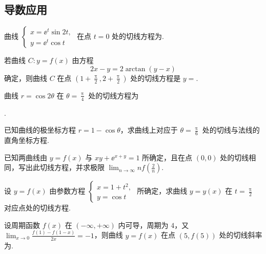 \subsection{导数应用}

	\begin{ti}
		曲线 $\begin{cases}
			x = \ee^{t} \sin 2t,\\
			y = \ee^{t} \cos t
		\end{cases}$ 在点 $t = 0$ 处的切线方程为\htwo.
	\end{ti}

	\begin{ti}
		若曲线 $C: y = f(x)$ 由方程
		\[
			2x - y = 2\arctan(y - x)
		\]
		确定，则曲线 $C$ 在点 $\left( 1 + \frac{\uppi}{2}, 2 + \frac{\uppi}{2} \right)$ 处的切线方程是 $y = $\htwo.
	\end{ti}

	\begin{ti}
		曲线 $r = \cos 2 \theta$ 在 $\theta = \frac{\uppi}{4}$ 处的切线方程为\htwo
		
		\noindent\htwo.
	\end{ti}

	\begin{ti}
		已知曲线的极坐标方程 $r = 1 - \cos \theta$，求曲线上对应于 $\theta = \frac{\uppi}{6}$ 处的切线与法线的直角坐标方程.
	\end{ti}

	\begin{ti}
		已知两曲线由 $y = f(x)$ 与 $xy + \ee^{x + y} = 1$ 所确定，且在点 $(0,0)$ 处的切线相同，写出此切线方程，并求极限 $\lim_{n \to \infty} n f\left( \frac{2}{n} \right)$.
	\end{ti}

	\begin{ti}
		设 $y = f(x)$ 由参数方程 $\begin{cases}
			x = 1 + t^{2},\\
			y = \cos t
		\end{cases}$ 所确定，求曲线 $y = y(x)$ 在 $t = \frac{\uppi}{2}$ 对应点处的切线方程.
	\end{ti}

	\begin{ti}
		设周期函数 $f(x)$ 在 $(-\infty,+\infty)$ 内可导，周期为 $4$，又 $\lim_{x \to 0} \frac{f(1) - f(1 - x)}{2x} = -1$，则曲线 $y = f(x)$ 在点 $(5,f(5))$ 处的切线斜率为\kuo.
		
		\fourch{$\frac{1}{2}$}{$0$}{$-1$}{$-2$}
	\end{ti}

